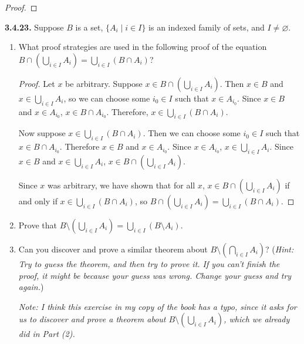 \documentclass[12pt]{amsart}
\newenvironment{statement}[1]{\smallskip\noindent\color[rgb]{.6627, .3529, .6314} {\bf #1.}}{}
\theoremstyle{definition}
\theoremstyle{remark}
\begin{document}
\begin{proof}
\end{proof}


\begin{statement}{3.4.23}
Suppose $B$ is a set, $\{ A_i \mid i \in I \}$ is an indexed family of sets, and $I \neq \varnothing$.
\begin{enumerate}
	\item What proof strategies are used in the following proof of the equation
	$B \cap \left( \bigcup_{i \in I} A_i \right) = \bigcup_{i \in I} (B \cap A_i)$?
	\begin{proof}
		Let $x$ be arbitrary.
		Suppose $x \in B \cap \left( \bigcup_{i \in I} A_i \right)$.
		Then $x \in B$ and $x \in \bigcup_{i \in I} A_i$,
		so we can choose some $i_0 \in I$ such that $x \in A_{i_0}$.
		Since $x \in B$ and $x \in A_{i_0}$, $x \in B \cap A_{i_0}$.
		Therefore, $x \in \bigcup_{i \in I} (B \cap A_i)$.
		
		Now suppose $x \in \bigcup_{i \in I} (B \cap A_i)$.
		Then we can choose some $i_0 \in I$ such that $x \in B \cap A_{i_0}$.
		Therefore $x \in B$ and $x \in A_{i_0}$.
		Since $x \in A_{i_0}$, $x \in \bigcup_{i \in I} A_i$.
		Since $x \in B$ and $x \in \bigcup_{i \in I} A_i$,
		$x \in B \cap \left( \bigcup_{i \in I} A_i \right)$.
		
		Since $x$ was arbitrary, we have shown that for all $x$,
		$x \in B \cap \left( \bigcup_{i \in I} A_i \right)$ if and only if
		$x \in \bigcup_{i \in I} (B \cap A_i)$, so
		$B \cap \left( \bigcup_{i \in I} A_i \right) = \bigcup_{i \in I} (B \cap A_i)$.
	\end{proof}
	
	\item Prove that $B \setminus \left( \bigcup_{i \in I} A_i \right) = 
	\bigcup_{i \in I} (B \setminus A_i)$.
	
	\item Can you discover and prove a similar theorem about
	$B \setminus \left( \bigcap_{i \in I} A_i \right)$?
	(\emph{Hint: Try to guess the theorem, and then try to prove it.
	If you can't finish the proof, it might be because your guess was wrong.
	Change your guess and try again.})
	
	\emph{Note: I think this exercise in my copy of the book has a typo, since it asks for
	us to discover and prove a theorem about $B \setminus \left( \bigcup_{i \in I} A_i \right)$,
	which we already did in Part (2).}
\end{enumerate}
\end{statement}
\end{document}

